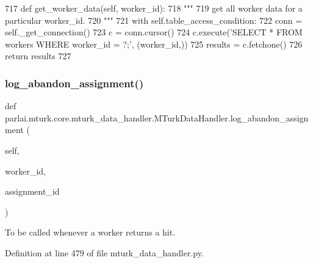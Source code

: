 \begin{DoxyCode}
717     \textcolor{keyword}{def }get\_worker\_data(self, worker\_id):
718         \textcolor{stringliteral}{"""}
719 \textcolor{stringliteral}{        get all worker data for a particular worker\_id.}
720 \textcolor{stringliteral}{        """}
721         with self.table\_access\_condition:
722             conn = self.\_get\_connection()
723             c = conn.cursor()
724             c.execute(\textcolor{stringliteral}{'SELECT * FROM workers WHERE worker\_id = ?;'}, (worker\_id,))
725             results = c.fetchone()
726             \textcolor{keywordflow}{return} results
727 
\end{DoxyCode}
\mbox{\label{classparlai_1_1mturk_1_1core_1_1mturk__data__handler_1_1MTurkDataHandler_ab4a4d10fa1923efc5dfdcf2e451c816f}} 
\subsubsection{\texorpdfstring{log\+\_\+abandon\+\_\+assignment()}{log\_abandon\_assignment()}}
{\footnotesize\ttfamily def parlai.\+mturk.\+core.\+mturk\+\_\+data\+\_\+handler.\+M\+Turk\+Data\+Handler.\+log\+\_\+abandon\+\_\+assignment (\begin{DoxyParamCaption}\item[{}]{self,  }\item[{}]{worker\+\_\+id,  }\item[{}]{assignment\+\_\+id }\end{DoxyParamCaption})}

\begin{DoxyVerb}To be called whenever a worker returns a hit.
\end{DoxyVerb}
 

Definition at line 479 of file mturk\+\_\+data\+\_\+handler.\+py.



